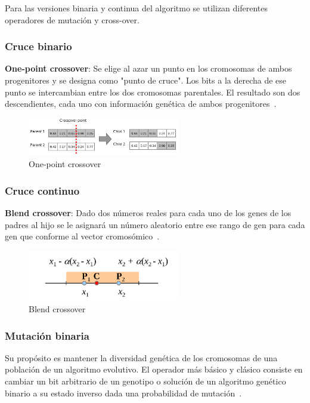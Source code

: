 Para las versiones binaria y continua del algoritmo se utilizan diferentes operadores de mutación y cross-over.

\subsubsection{Cruce binario}
\textbf{One-point crossover}: Se elige al azar un punto en los cromosomas de ambos progenitores y se designa como "punto de cruce". Los bits a la derecha de ese punto se intercambian entre los dos cromosomas parentales. El resultado son dos descendientes, cada uno con información genética de ambos progenitores~\cite{DAGDIA2020283}.
\begin{figure}[htp]
    \begin{center}
        \includegraphics[width=0.6\textwidth]{imagenes/one-point-crossover.png}
    \end{center}
    \caption[One point crossover]{One-point crossover~\cite{purduelecture}}
\end{figure}

\subsubsection{Cruce continuo}
\textbf{Blend crossover}: Dado dos números reales para cada uno de los genes de los padres al hijo se le asignará un número aleatorio entre ese rango de gen para cada gen que conforme al vector cromosómico~\cite{purduelecture}.
\begin{figure}[htp]
    \begin{center}
        \includegraphics[width=0.6\textwidth]{imagenes/blend-crossover.png}
    \end{center}
    \caption[Blend crossover]{Blend crossover~\cite{purduelecture}}
\end{figure}

\subsubsection{Mutación binaria}
Su propósito es mantener la diversidad genética de los cromosomas de una población de un algoritmo evolutivo.
El operador más básico y clásico consiste en cambiar un bit arbitrario de un genotipo o solución de un algoritmo genético binario a su estado inverso dada una probabilidad de mutación~\cite{mirjalili2019genetic}.

